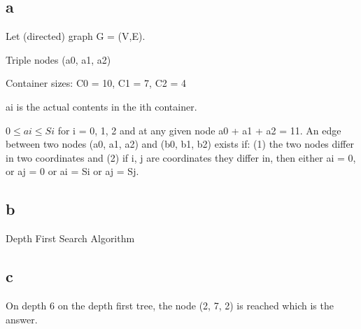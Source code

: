 \documentclass{article}
\begin{document}
\subsection{a}
Let (directed) graph G = (V,E).

Triple nodes (a0, a1, a2)

Container sizes: C0 = 10, C1 = 7, C2 = 4

ai is the actual contents in the ith container. 

$0 \leq ai \leq Si$ for i = 0, 1, 2 and at any given node a0 + a1 + a2 = 11. An edge between two nodes (a0, a1, a2) and (b0, b1, b2) exists if: (1) the two nodes differ in two coordinates and (2) if i, j are coordinates they differ in, then either ai = 0, or aj = 0 or ai = Si or aj = Sj.
\subsection{b}
Depth First Search Algorithm

\subsection{c}
On depth 6 on the depth first tree, the node (2, 7, 2) is reached which is the answer.
\end{document}
